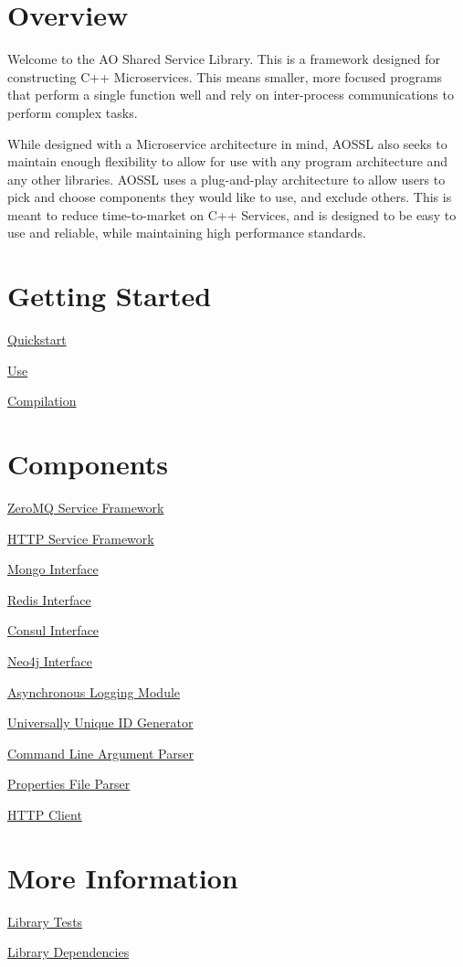 \hypertarget{index_over}{}\section{Overview}\label{index_over}
Welcome to the AO Shared Service Library. This is a framework designed for constructing C++ Microservices. This means smaller, more focused programs that perform a single function well and rely on inter-\/process communications to perform complex tasks.

While designed with a Microservice architecture in mind, A\+O\+S\+SL also seeks to maintain enough flexibility to allow for use with any program architecture and any other libraries. A\+O\+S\+SL uses a plug-\/and-\/play architecture to allow users to pick and choose components they would like to use, and exclude others. This is meant to reduce time-\/to-\/market on C++ Services, and is designed to be easy to use and reliable, while maintaining high performance standards.\hypertarget{index_gettingstarted}{}\section{Getting Started}\label{index_gettingstarted}

\begin{DoxyItemize}
\item \hyperlink{quickstart}{Quickstart}
\item \hyperlink{use_index}{Use}
\item \hyperlink{compilation}{Compilation}
\end{DoxyItemize}\hypertarget{index_features}{}\section{Components}\label{index_features}

\begin{DoxyItemize}
\item \hyperlink{zeromq}{Zero\+MQ Service Framework}
\item \hyperlink{http_server}{H\+T\+TP Service Framework}
\item \hyperlink{mongo}{Mongo Interface}
\item \hyperlink{redis}{Redis Interface}
\item \hyperlink{consul}{Consul Interface}
\item \hyperlink{neo4j}{Neo4j Interface}
\item \hyperlink{logging}{Asynchronous Logging Module}
\item \hyperlink{uuid}{Universally Unique ID Generator}
\item \hyperlink{cli}{Command Line Argument Parser}
\item \hyperlink{props}{Properties File Parser}
\item \hyperlink{http_client}{H\+T\+TP Client}
\end{DoxyItemize}\hypertarget{index_moreinfo}{}\section{More Information}\label{index_moreinfo}

\begin{DoxyItemize}
\item \hyperlink{tests}{Library Tests}
\item \hyperlink{dependencies}{Library Dependencies} 
\end{DoxyItemize}